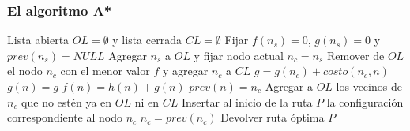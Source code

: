 \documentclass[10pt,spanish,aspectratio=1610]{beamer}
\begin{document}
\begin{frame}\frametitle{El algoritmo A*}
    \begin{algorithm}[H]
    \footnotesize
    \DontPrintSemicolon
    Lista abierta $OL = \emptyset$ y lista cerrada $CL = \emptyset$\;
    Fijar $f(n_{s}) = 0$, $g(n_{s}) = 0$ y $prev(n_{s}) = NULL$\;
    Agregar $n_s$ a $OL$ y fijar nodo actual $n_c = n_s$\;
    {
      Remover de $OL$ el nodo $n_c$ con el menor valor $f$ y agregar $n_c$ a $CL$\;
             {
               $g = g(n_c) + costo(n_c, n)$\;
                  {
                    $g(n) = g$\;
                    $f(n) = h(n) + g(n)$\;
                    $prev(n) = n_c$\;
                  }
             }
      Agregar a $OL$ los vecinos de $n_c$ que no estén ya en $OL$ ni en $CL$\;
    }
          {
            Insertar al inicio de la ruta $P$ la configuración correspondiente al nodo $n_c$\;
            $n_c = prev(n_c)$
          }
    Devolver ruta óptima $P$
  \end{algorithm}
\end{frame}
\end{document}
